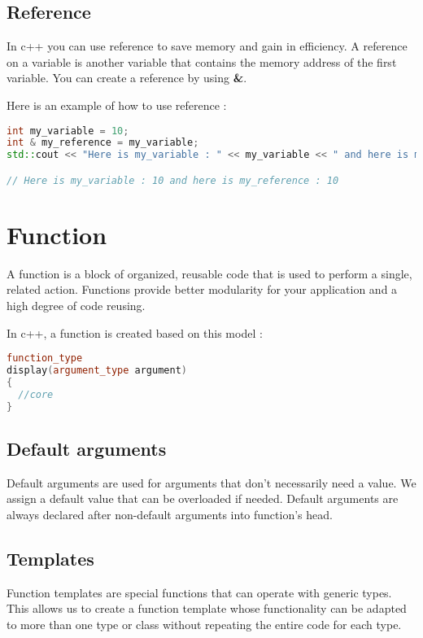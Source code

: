 \documentclass[a4paper, 12pt, titlepage]{scrartcl} %
\begin{document}
\subsection{Reference}
In c++ you can use reference to save memory and gain in efficiency. A reference on a variable is another variable that contains the memory address of the first variable. You can create a reference by using \textbf{\&}.

\vspace{5mm}

Here is an example of how to use reference :
\begin{lstlisting}[language=C++]
int my_variable = 10;
int & my_reference = my_variable;
std::cout << "Here is my_variable : " << my_variable << " and here is my_reference : " << my_reference << std::endl;

// Here is my_variable : 10 and here is my_reference : 10
\end{lstlisting} \vspace{5mm}


\newpage
\section{Function}
A function is a block of organized, reusable code that is used to perform a single, related action. Functions provide better modularity for your application and a high degree of code reusing.

In c++, a function is created based on this model :

\begin{lstlisting}[language=C++]
function_type
display(argument_type argument)
{
  //core
}
\end{lstlisting} \vspace{5mm}

\subsection{Default arguments}
Default arguments are used for arguments that don't necessarily need a value. We assign a default value that can be overloaded if needed. Default arguments are always declared after non-default arguments into function's head. 

\subsection{Templates}
Function templates are special functions that can operate with generic types. This allows us to create a function template whose functionality can be adapted to more than one type or class without repeating the entire code for each type.
\end{document}
